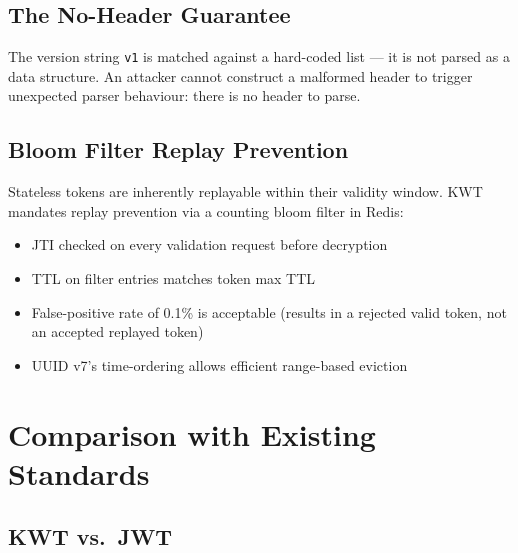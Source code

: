 \documentclass[11pt, letterpaper]{article}
\begin{document}
\subsection{The No-Header Guarantee}

The version string \texttt{v1} is matched against a hard-coded list — it is
not parsed as a data structure. An attacker cannot construct a malformed header
to trigger unexpected parser behaviour: there is no header to parse.

\subsection{Bloom Filter Replay Prevention}

Stateless tokens are inherently replayable within their validity window.
KWT mandates replay prevention via a counting bloom filter in Redis:

\begin{itemize}[noitemsep]
  \item JTI checked on every validation request before decryption
  \item TTL on filter entries matches token max TTL
  \item False-positive rate of 0.1\% is acceptable (results in a rejected
        valid token, not an accepted replayed token)
  \item UUID v7's time-ordering allows efficient range-based eviction
\end{itemize}

\section{Comparison with Existing Standards}

\subsection{KWT vs.\ JWT}
\end{document}
